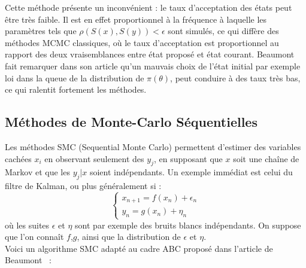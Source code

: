 \documentclass{article}
\theoremstyle{definition}
\begin{document}
Cette méthode présente un inconvénient : le taux d'acceptation des états peut être très faible. Il est en effet proportionnel à la fréquence à laquelle les paramètres tels que $\rho(S(x),S(y))<\epsilon$ sont simulés, ce qui diffère des méthodes MCMC classiques, où le taux d'acceptation est proportionnel au rapport des deux vraisemblances entre état proposé et état courant. Beaumont fait remarquer dans son article qu'un mauvais choix de l'état initial par exemple loi dans la queue de la distribution de $\pi(\theta)$, peut conduire à des taux très bas, ce qui ralentit fortement les méthodes.\\

\subsection{Méthodes de Monte-Carlo Séquentielles}

Les méthodes SMC (Sequential Monte Carlo) permettent d'estimer des variables cachées $x_i$ en observant seulement des $y_j$, en supposant que $x$ soit une chaîne de Markov et que les $y_j|x$ soient indépendants. Un exemple immédiat est celui du filtre de Kalman, ou plus généralement si :
\[\left\{ \begin{array}{l} x_{n+1}=f(x_n)+\epsilon_n \\ y_n=g(x_n)+\eta_n\end{array} \right.\]
où les suites $\epsilon$ et $\eta$ sont par exemple des bruits blancs indépendants. On suppose que l'on connaît $f$,$g$, ainsi que la distribution de $\epsilon$ et $\eta$. \\

Voici un algorithme SMC adapté au cadre ABC proposé dans l'article de Beaumont~\cite{Beaumont} :\\
\end{document}
